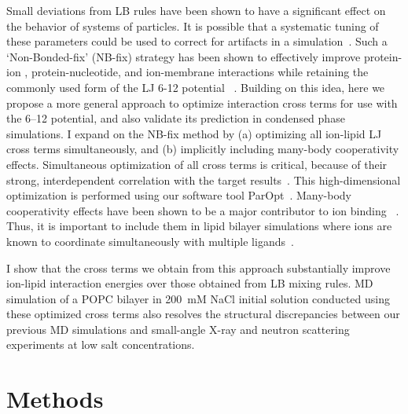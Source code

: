 Small deviations from LB rules have been shown to have a significant
    effect on the behavior of systems of particles\cite{boda:2008:effects}.
    It is possible that a systematic tuning of these parameters could be used to correct 
    for artifacts in a simulation~\cite{baker:2010:accurate,yoo:2012:improved,fyta:2012:ionic,mamatkulov:2013:force,venable:2013,
savelyev:2014:balancing,li:2015:representation,savelyev:2015:competition,jing:2017:study,reif:2017,wineman:2019}.
Such a `Non-Bonded-fix' (NB-fix) strategy has been shown to effectively improve 
protein-ion 
, protein-nucleotide, and ion-membrane interactions 
while retaining the commonly used form of the LJ 6-12 potential~
\cite{baker:2010:accurate,yoo:2012:improved,fyta:2012:ionic,mamatkulov:2013:force,venable:2013,
savelyev:2014:balancing,li:2015:representation,savelyev:2015:competition,jing:2017:study,reif:2017,wineman:2019}. 
Building on this idea, here we propose a more 
general approach to optimize interaction cross terms
for use with the 6--12 potential, 
and also validate its prediction in condensed phase simulations.  
I expand on the NB-fix method by
(a) optimizing all ion-lipid LJ cross terms simultaneously, and 
(b) implicitly including many-body cooperativity effects.
Simultaneous optimization of all cross terms is critical, 
because of their strong, interdependent correlation with the target results~\cite{fogarty:2014:paropt}.
This high-dimensional optimization is performed using our software tool
ParOpt~\cite{fogarty:2014:paropt,fogarty:2014:thesis}.
Many-body cooperativity effects have been shown to be a major contributor to ion 
binding~\cite{varma:2010}
. Thus, it is important to include them in lipid bilayer simulations where ions are known
to coordinate simultaneously with multiple ligands~\cite{kruczek:2019}.

I show that the cross terms we obtain from this approach substantially improve 
ion-lipid interaction energies over those obtained from LB mixing rules. 
MD simulation of a POPC bilayer
 in 200~mM NaCl initial solution 
conducted using these optimized cross terms also 
resolves the structural discrepancies between our 
previous MD simulations and small-angle X-ray and neutron scattering experiments 
at low salt concentrations.


\section{Methods}

